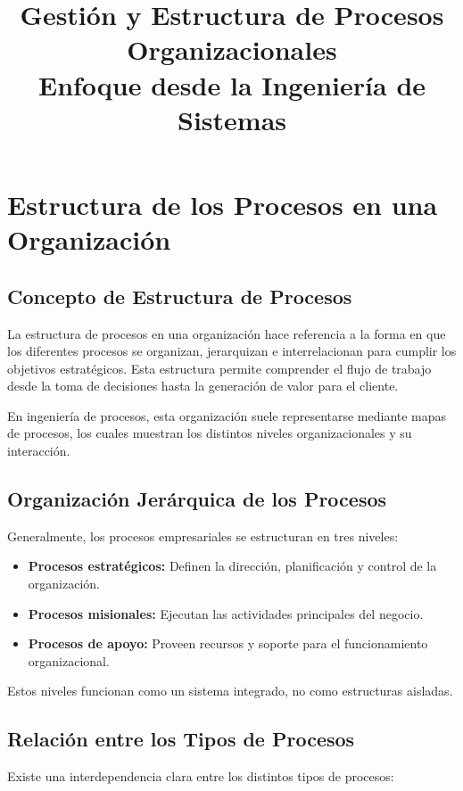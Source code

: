 \documentclass[12pt,a4paper]{article}
\title{Gestión y Estructura de Procesos Organizacionales\\
\large Enfoque desde la Ingeniería de Sistemas}
\author{}
\date{}
\begin{document}
\maketitle

\tableofcontents
\newpage

\section{Estructura de los Procesos en una Organización}

\subsection{Concepto de Estructura de Procesos}
La estructura de procesos en una organización hace referencia a la forma en que los diferentes procesos se organizan, jerarquizan e interrelacionan para cumplir los objetivos estratégicos. Esta estructura permite comprender el flujo de trabajo desde la toma de decisiones hasta la generación de valor para el cliente.

En ingeniería de procesos, esta organización suele representarse mediante mapas de procesos, los cuales muestran los distintos niveles organizacionales y su interacción.

\subsection{Organización Jerárquica de los Procesos}
Generalmente, los procesos empresariales se estructuran en tres niveles:

\begin{itemize}
    \item \textbf{Procesos estratégicos:} Definen la dirección, planificación y control de la organización.
    \item \textbf{Procesos misionales:} Ejecutan las actividades principales del negocio.
    \item \textbf{Procesos de apoyo:} Proveen recursos y soporte para el funcionamiento organizacional.
\end{itemize}

Estos niveles funcionan como un sistema integrado, no como estructuras aisladas.

\subsection{Relación entre los Tipos de Procesos}
Existe una interdependencia clara entre los distintos tipos de procesos:
\end{document}
